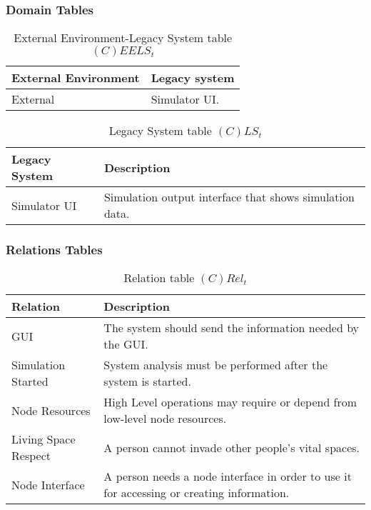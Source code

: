 \subsubsection{Domain Tables}

\begin{table}[H]
	\centering
	\begin{tabular}{|p{4cm}|p{8cm}|}
			\hline
			\textbf{External Environment} & \textbf{Legacy system} \\
			\hline
			External & Simulator UI. \\
			\hline
		\end{tabular}
	\caption{External Environment-Legacy System table $(C)EELS_t$}
	\label{tab:ceelst}
\end{table}

\begin{table}[H]
	\centering
	\begin{tabular}{|p{4cm}|p{8cm}|}
			\hline
			\textbf{Legacy System} & \textbf{Description} \\
			\hline
			Simulator UI & Simulation output interface that shows simulation data. \\
			\hline
		\end{tabular}
	\caption{Legacy System table $(C)LS_t$}
	\label{tab:clst}
\end{table}

\subsubsection{Relations Tables}

\begin{table}[H]
	\centering
	\begin{tabular}{|p{4cm}|p{8cm}|}
			\hline
			\textbf{Relation} & \textbf{Description} \\
			\hline
			GUI & The system should send the information needed by the GUI. \\
			\hline
			Simulation Started & System analysis must be performed after the system
			is started. \\
			\hline
			Node Resources & High Level operations may require or depend from
			low-level node resources. \\
			\hline
			Living Space Respect & A person cannot invade other people's vital spaces. \\
			\hline
			Node Interface & A person needs a node interface in order to use it for
			accessing or creating information. \\
			\hline
		\end{tabular}
	\caption{Relation table $(C)Rel_t$}
	\label{tab:crelt}
\end{table}

